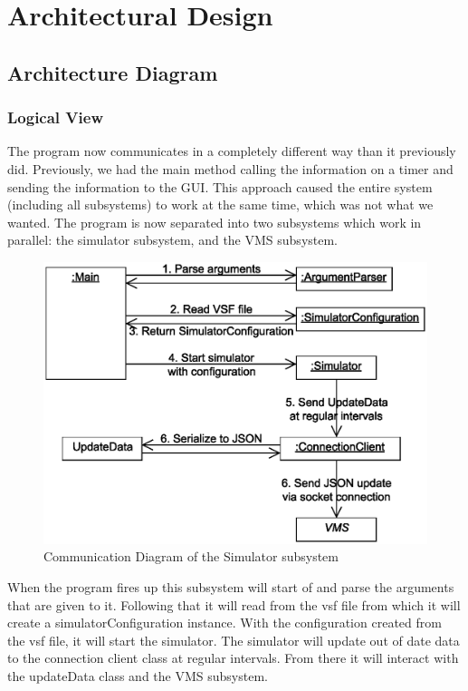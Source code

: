 \documentclass{article}
\begin{document}
\section{Architectural Design} %

\subsection{Architecture Diagram} %

\subsubsection{Logical View} %

The program now communicates in a completely different way than it previously did. Previously, we had the main method calling the information on a timer and sending the information to the GUI. This approach caused the entire system (including all subsystems) to work at the same time, which was not what we wanted. The program is now separated into two subsystems which work in parallel: the simulator subsystem, and the VMS subsystem.

\begin{figure}[!htb]
\caption{Communication Diagram of the Simulator subsystem}
\centering
\includegraphics[scale=0.3]{diagrams/simulator-communication-diagram.eps}
\end{figure}

When the program fires up this subsystem will start of and parse the arguments that are given to it. Following that it will read from the vsf file from which it will create a simulatorConfiguration instance. With the configuration created from the vsf file, it will start the simulator.  The simulator will update out of date data to the connection client class at regular intervals. From there it will interact with the updateData class and the VMS subsystem.
\end{document}
